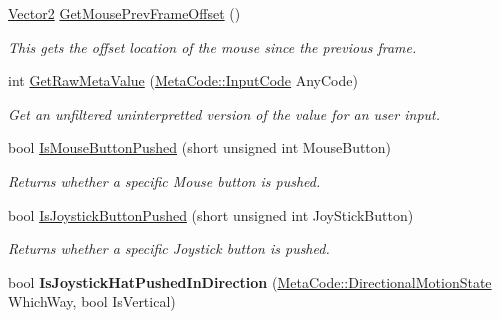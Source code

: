 \begin{DoxyCompactItemize}
\hyperlink{classphys_1_1Vector2}{Vector2} \hyperlink{classphys_1_1InputQueryTool_aea2da0aeb97353f9d7af75f2a8cb7d91}{GetMousePrevFrameOffset} ()
\begin{DoxyCompactList}\small\item\em This gets the offset location of the mouse since the previous frame. \item\end{DoxyCompactList}\item 
int \hyperlink{classphys_1_1InputQueryTool_a59fb8638d5d3ce89f4347ca8090a1afb}{GetRawMetaValue} (\hyperlink{classphys_1_1MetaCode_a3e501cbb5bf0f6f1fdb7211465bda8d8}{MetaCode::InputCode} AnyCode)
\begin{DoxyCompactList}\small\item\em Get an unfiltered uninterpretted version of the value for an user input. \item\end{DoxyCompactList}\item 
bool \hyperlink{classphys_1_1InputQueryTool_aab9a7be4d95289d828378f7f3d5fc065}{IsMouseButtonPushed} (short unsigned int MouseButton)
\begin{DoxyCompactList}\small\item\em Returns whether a specific Mouse button is pushed. \item\end{DoxyCompactList}\item 
bool \hyperlink{classphys_1_1InputQueryTool_ae3e63f8f93a0b270b22e685d3b86c890}{IsJoystickButtonPushed} (short unsigned int JoyStickButton)
\begin{DoxyCompactList}\small\item\em Returns whether a specific Joystick button is pushed. \item\end{DoxyCompactList}\item 
\hypertarget{classphys_1_1InputQueryTool_a47b0d887f62fcd43f75308c6269e8411}{
bool {\bfseries IsJoystickHatPushedInDirection} (\hyperlink{classphys_1_1MetaCode_ad6ed6266b5f4219a6f5da29ebe018757}{MetaCode::DirectionalMotionState} WhichWay, bool IsVertical)}
\label{da/d96/classphys_1_1InputQueryTool_a47b0d887f62fcd43f75308c6269e8411}


\end{DoxyCompactItemize}
